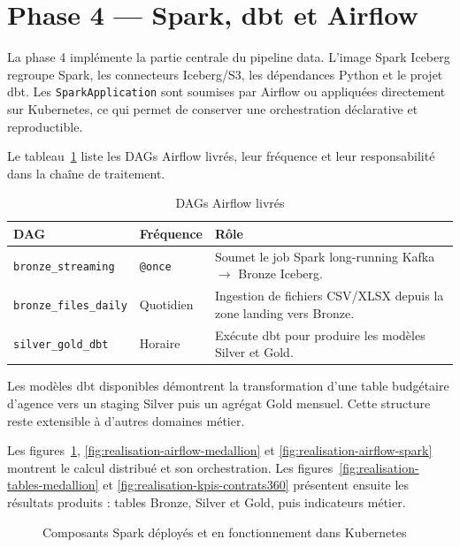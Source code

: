 \section{Phase 4 — Spark, dbt et Airflow}

La phase 4 implémente la partie centrale du pipeline data. L'image Spark Iceberg regroupe Spark, les connecteurs Iceberg/S3, les dépendances Python et le projet dbt. Les \texttt{SparkApplication} sont soumises par Airflow ou appliquées directement sur Kubernetes, ce qui permet de conserver une orchestration déclarative et reproductible.

Le tableau~\ref{tab:dags} liste les DAGs Airflow livrés, leur fréquence et leur responsabilité dans la chaîne de traitement.

\begin{table}[H]
\centering
\caption{DAGs Airflow livrés}
\label{tab:dags}
\small
\begin{tabular}{@{}p{}p{}p{}@{}}
\toprule
\textbf{DAG} & \textbf{Fréquence} & \textbf{Rôle} \\
\midrule
\texttt{bronze\_streaming} & \texttt{@once} & Soumet le job Spark long-running Kafka $\rightarrow$ Bronze Iceberg. \\
\texttt{bronze\_files\_daily} & Quotidien & Ingestion de fichiers CSV/XLSX depuis la zone landing vers Bronze. \\
\texttt{silver\_gold\_dbt} & Horaire & Exécute dbt pour produire les modèles Silver et Gold. \\
\bottomrule
\end{tabular}
\end{table}

Les modèles dbt disponibles démontrent la transformation d'une table budgétaire d'agence vers un staging Silver puis un agrégat Gold mensuel. Cette structure reste extensible à d'autres domaines métier.

Les figures~\ref{fig:realisation-spark-running}, \ref{fig:realisation-airflow-medallion} et \ref{fig:realisation-airflow-spark} montrent le calcul distribué et son orchestration. Les figures~\ref{fig:realisation-tables-medallion} et \ref{fig:realisation-kpis-contrats360} présentent ensuite les résultats produits : tables Bronze, Silver et Gold, puis indicateurs métier.

\begin{figure}[H]
\centering
{}
\caption{Composants Spark déployés et en fonctionnement dans Kubernetes}
\label{fig:realisation-spark-running}
\end{figure}

